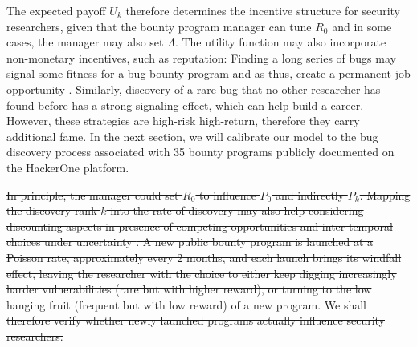  The expected payoff $U_k$ therefore determines the incentive structure for security researchers, given that the bounty program manager can tune $R_0$ and in some cases, the manager may also set $\Lambda$. The utility function may also incorporate non-monetary incentives, such as reputation: Finding a long series of bugs may signal some fitness for a bug bounty program and as thus, create a permanent job opportunity \cite{moussouris2016}. Similarly, discovery of a rare bug that no other researcher has found before has a strong signaling effect, which can help build a career. However, these strategies are high-risk high-return,  therefore they carry additional fame. In the next section, we will calibrate our model to the bug discovery process associated with 35 bounty programs publicly documented on the HackerOne platform.


\sout{In principle, the manager could set $R_0$ to influence $P_0$ and indirectly $P_{k}$. Mapping the discovery rank $k$ into the rate of discovery may also help considering discounting aspects in presence of competing opportunities and inter-temporal choices under uncertainty \cite{loewenstein1992anomalies}. A new public bounty program is launched at a Poisson rate, approximately every 2 months, and each launch brings its windfall effect, leaving the researcher with the choice to either keep digging increasingly harder vulnerabilities (rare but with higher reward), or turning to the low hanging fruit (frequent but with low reward) of a new program. We shall therefore verify whether newly launched programs actually influence security researchers.}



